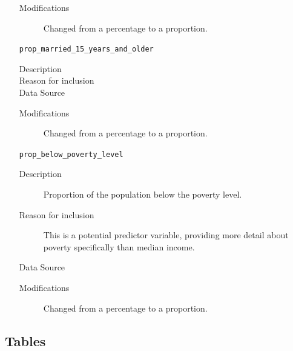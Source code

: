 \documentclass{article}
\begin{document}
\begin{itemize}[label={}, align=left]
\begin{description}
              \item[Modifications] Changed from a percentage to a proportion.
          \end{description}
    \item[\texttt{prop\_married\_15\_years\_and\_older}] \
          \begin{description}
              \item[Description] 
              \item[Reason for inclusion] \maritalreason
              \item[Data Source] \cite{acs_education_data}
              \item[Modifications] Changed from a percentage to a proportion.
          \end{description}
    \item[\texttt{prop\_below\_poverty\_level}] \
          \begin{description}
              \item[Description] Proportion of the population below the poverty level.
              \item[Reason for inclusion] This is a potential predictor
                    variable, providing more detail about poverty specifically
                    than median income.
              \item[Data Source] \cite{acs_poverty_data}
              \item[Modifications] Changed from a percentage to a proportion.
          \end{description}
\end{itemize}

\pagebreak

\subsection{Tables}
\end{document}
